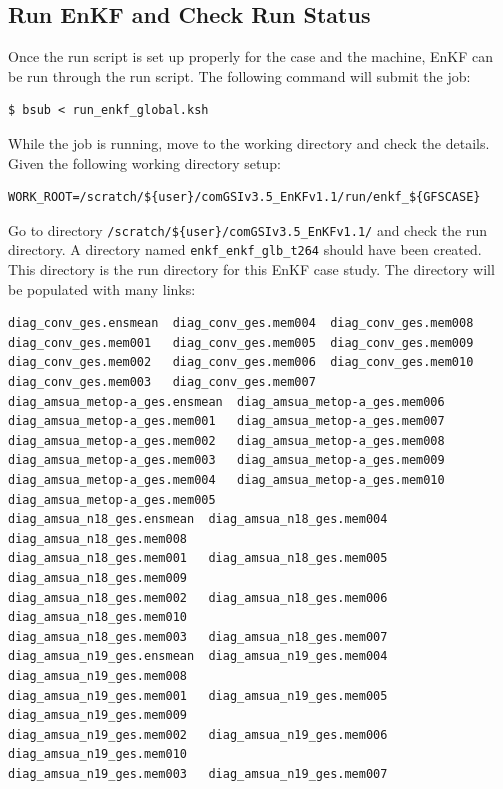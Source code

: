 \subsection{Run EnKF and Check Run Status}

Once the run script is set up properly for the case and the machine, EnKF can be run through the run script. The following command will submit the job:

\begin{footnotesize}
\begin{verbatim}
$ bsub < run_enkf_global.ksh
\end{verbatim}
\end{footnotesize}
While the job is running, move to the working directory and check the details. Given the following working directory setup:
\begin{footnotesize}
\begin{verbatim}
WORK_ROOT=/scratch/${user}/comGSIv3.5_EnKFv1.1/run/enkf_${GFSCASE}
\end{verbatim}
\end{footnotesize}

Go to directory \verb|/scratch/${user}/comGSIv3.5_EnKFv1.1/| and check the run directory. A directory named \verb|enkf_enkf_glb_t264| should have been created. This directory is the run directory for this EnKF case study. The directory will be populated with many links:
\begin{footnotesize}
\begin{verbatim}
diag_conv_ges.ensmean  diag_conv_ges.mem004  diag_conv_ges.mem008
diag_conv_ges.mem001   diag_conv_ges.mem005  diag_conv_ges.mem009
diag_conv_ges.mem002   diag_conv_ges.mem006  diag_conv_ges.mem010
diag_conv_ges.mem003   diag_conv_ges.mem007
diag_amsua_metop-a_ges.ensmean  diag_amsua_metop-a_ges.mem006
diag_amsua_metop-a_ges.mem001   diag_amsua_metop-a_ges.mem007
diag_amsua_metop-a_ges.mem002   diag_amsua_metop-a_ges.mem008
diag_amsua_metop-a_ges.mem003   diag_amsua_metop-a_ges.mem009
diag_amsua_metop-a_ges.mem004   diag_amsua_metop-a_ges.mem010
diag_amsua_metop-a_ges.mem005
diag_amsua_n18_ges.ensmean  diag_amsua_n18_ges.mem004  diag_amsua_n18_ges.mem008
diag_amsua_n18_ges.mem001   diag_amsua_n18_ges.mem005  diag_amsua_n18_ges.mem009
diag_amsua_n18_ges.mem002   diag_amsua_n18_ges.mem006  diag_amsua_n18_ges.mem010
diag_amsua_n18_ges.mem003   diag_amsua_n18_ges.mem007
diag_amsua_n19_ges.ensmean  diag_amsua_n19_ges.mem004  diag_amsua_n19_ges.mem008
diag_amsua_n19_ges.mem001   diag_amsua_n19_ges.mem005  diag_amsua_n19_ges.mem009
diag_amsua_n19_ges.mem002   diag_amsua_n19_ges.mem006  diag_amsua_n19_ges.mem010
diag_amsua_n19_ges.mem003   diag_amsua_n19_ges.mem007
\end{verbatim}
\end{footnotesize}


